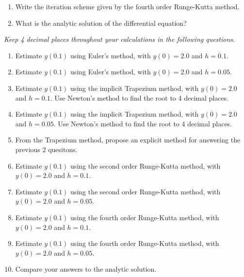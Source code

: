 {\begin{enumerate}[label=\alph*)]
	\item Write the iteration scheme given by the fourth order Runge-Kutta method.
	
	\item What is the analytic solution of the differential equation?
\end{enumerate}




\textit{Keep 4 decimal places throughout your calculations in the following questions.}
\begin{enumerate}[label=\alph*)]
	\item Estimate $y(0.1)$ using Euler's method, with $y(0)=2.0$ and $h=0.1$.
	
	\item Estimate $y(0.1)$ using Euler's method, with $y(0)=2.0$ and $h=0.05$.
	
	\item Estimate $y(0.1)$ using the implicit Trapezium method, with $y(0)=2.0$ and $h=0.1$. Use Newton’s method to find the root to 4 decimal places.
	
	\item Estimate $y(0.1)$ using the implicit Trapezium method, with $y(0)=2.0$ and $h=0.05$. Use Newton’s method to find the root to 4 decimal places.
	
	\item From the Trapezium method, propose an explicit method for answering the previous 2 quesitons.
	
	\item Estimate $y(0.1)$ using the second order Runge-Kutta method, with $y(0)=2.0$ and $h=0.1$.
	
	\item Estimate $y(0.1)$ using the second order Runge-Kutta method, with $y(0)=2.0$ and $h=0.05$.
	
	\item Estimate $y(0.1)$ using the fourth order Runge-Kutta method, with $y(0)=2.0$ and $h=0.1$.
	
	\item Estimate $y(0.1)$ using the fourth order Runge-Kutta method, with $y(0)=2.0$ and $h=0.05$.
	
	\item Compare your answers to the analytic solution.
\end{enumerate}




}
